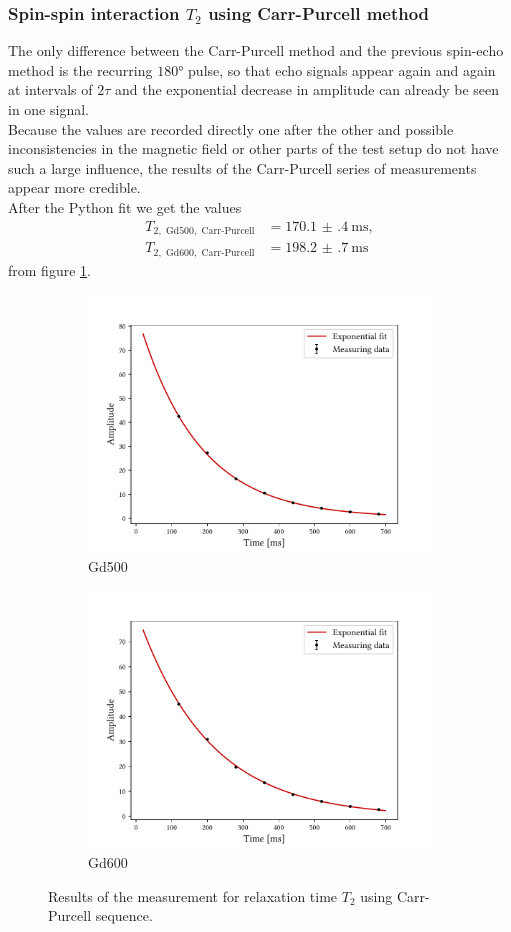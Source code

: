 \subsubsection{Spin-spin interaction $T_2$ using Carr-Purcell method}
The only difference between the Carr-Purcell method and the previous spin-echo method is the recurring $\ang{180}$ pulse, so that echo signals appear again and again at intervals of $2\tau$ and the exponential decrease in amplitude can already be seen in one signal.\\
Because the values are recorded directly one after the other and possible inconsistencies in the magnetic field or other parts of the test setup do not have such a large influence, the results of the Carr-Purcell series of measurements appear more credible.\\
After the Python fit we get the values
\begin{align*}
T_{2,\text{ Gd500},\text{ Carr-Purcell}}&=\SI{170.1(4)}{\milli\second},\\
T_{2,\text{ Gd600},\text{ Carr-Purcell}}&=\SI{198.2(7)}{\milli\second}
\end{align*}
from figure \ref{fig:t2cp}.
\begin{figure}[ht]
\begin{subfigure}{.45\textwidth}
\includegraphics[width=9.3cm]{..//figures//f61_abb_3.pdf}
\caption{Gd500}
\end{subfigure}
\qquad
\begin{subfigure}{.45\textwidth}
\includegraphics[width=9.3cm]{..//figures//f61_abb_3_600.pdf}
\caption{Gd600}
\end{subfigure}
\caption{Results of the measurement for relaxation time $T_2$ using Carr-Purcell sequence.}
\label{fig:t2cp}
\end{figure}


